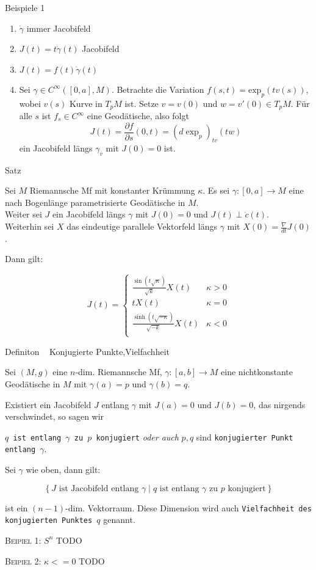 \documentclass[a6paper,11pt,grid=front]{kartei}
\newcommand{\fl}[1]{\begin{flushleft}
 #1 \end{flushleft}}
\newcommand{\nabladt}[1][t]{\frac{\nabla}{d#1}}
\newcounter{def}
\newcounter{satz}
\newcommand{\defreset}{\setcounter{def}{1}}
\newcommand{\satzreset}{\setcounter{satz}{1}}
\newcommand{\thisdef}{\thedef\ \stepcounter{def}}
\newcommand{\thissatz}{\thesatz\ \stepcounter{satz}}
\begin{document}
\nonameyet
{Beispiele 1} {}
{
	\small
\begin{enumerate}[1.]
\item $\dot \gamma$ immer Jacobifeld
\item $J(t) = t \dot\gamma(t)$ Jacobifeld
\item $J(t) = f(t) \dot \gamma(t)$
\item Sei $\gamma\in C^\infty([0,a],M)$. Betrachte die Variation 
$f(s,t) = \text{exp}_p(tv(s))$, wobei $v(s)$ Kurve in $T_pM$ ist.
Setze $v = v(0)$ und $w = v'(0)\in T_pM$. 
Für alle $s$ ist $f_s \in C^\infty$ eine Geodätische, also folgt
\[
J(t) = \frac{\partial f}{\partial s} (0,t) = (d \exp_p)_{tv}(tw)
\]
ein Jacobifeld längs $\gamma_v$ mit $J(0) = 0$ ist.
\end{enumerate}
}
{}

\nonameyet
{Satz \thissatz } {}
{
	\small
Sei $M$ Riemannsche Mf mit konstanter Krümmung $\kappa$.
Es sei $\gamma : [0,a] \to M$ eine nach Bogenlänge parametrisierte Geodätische
in $M$. 
\\ 
Weiter sei $J$ ein Jacobifeld längs $\gamma$ mit $J(0) = 0$ 
und $J(t) \perp \dot c(t)$.
\\
Weiterhin sei $X$ das eindeutige parallele Vektorfeld längs $\gamma$ mit 
$X(0) = \nabladt J (0)$.
\fl{Dann gilt:}
\[
J(t) =
\begin{cases}
\frac{\sin(t\sqrt{\kappa})}{\sqrt{k}} X(t)  & \kappa > 0\\
tX(t) & \kappa = 0\\
\frac{\sinh(t\sqrt{-\kappa})}{\sqrt{-k}} X(t)  & \kappa < 0\\
\end{cases}
\]
}
{}

\defreset
\satzreset
{}


\nonameyet
{Definiton \thisdef} {\scriptsize Konjugierte Punkte,Vielfachheit}
{
\small
Sei $(M,g)$ eine $n$-dim. Riemannsche Mf, $\gamma : [a,b] \to M$ eine nichtkonstante
Geodätische in $M$
mit $\gamma(a) = p$ und $\gamma(b) = q$.
\fl{Existiert ein Jacobifeld $J$ entlang $\gamma$ mit $J(a) = 0$ und 
$J(b) = 0$, das nirgends verschwindet, so sagen wir }
\texttt{$q$ ist entlang $\gamma$ zu $p$ konjugiert} \textit{oder auch} 
$p,q$ sind \texttt{konjugierter Punkt entlang $\gamma$}.
\fl{Sei $\gamma$ wie oben, dann gilt:}
\[
\left\{
\text{$J$ ist Jacobifeld entlang $\gamma$} 
\;|\; 
\text{$q$ ist entlang $\gamma$ zu $p$ konjugiert}
\right \}
\]
\fl{ist ein $(n-1)$-dim. Vektorraum. Diese Dimension wird auch 
\texttt{Vielfachheit des konjugierten Punktes $q$} genannt.}
\fl{\textsc{Beipiel 1:} $S^n$ TODO}
\fl{\textsc{Beipiel 2:} $\kappa <= 0$ TODO}
}
{}
\end{document}
